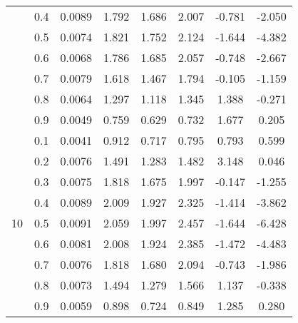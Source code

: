\documentclass[11pt,a4paper]{report}
\begin{document}
\begin{longtable}{ | c | c || c | c | c | c | c | c | }
 & 0.4 & 0.0089 & 1.792 & 1.686 & 2.007 & -0.781 & -2.050 \\
 & 0.5 & 0.0074 & 1.821 & 1.752 & 2.124 & -1.644 & -4.382 \\
 & 0.6 & 0.0068 & 1.786 & 1.685 & 2.057 & -0.748 & -2.667 \\
 & 0.7 & 0.0079 & 1.618 & 1.467 & 1.794 & -0.105 & -1.159 \\
 & 0.8 & 0.0064 & 1.297 & 1.118 & 1.345 & 1.388 & -0.271 \\
 & 0.9 & 0.0049 & 0.759 & 0.629 & 0.732 & 1.677 & 0.205 \\
 \hline
\multirow{9}{*}{10} & 0.1 & 0.0041 & 0.912 & 0.717 & 0.795 & 0.793 & 0.599 \\
 & 0.2 & 0.0076 & 1.491 & 1.283 & 1.482 & 3.148 & 0.046 \\
 & 0.3 & 0.0075 & 1.818 & 1.675 & 1.997 & -0.147 & -1.255 \\
 & 0.4 & 0.0089 & 2.009 & 1.927 & 2.325 & -1.414 & -3.862 \\
 & 0.5 & 0.0091 & 2.059 & 1.997 & 2.457 & -1.644 & -6.428 \\
 & 0.6 & 0.0081 & 2.008 & 1.924 & 2.385 & -1.472 & -4.483 \\
 & 0.7 & 0.0076 & 1.818 & 1.680 & 2.094 & -0.743 & -1.986 \\
 & 0.8 & 0.0073 & 1.494 & 1.279 & 1.566 & 1.137 & -0.338 \\
 & 0.9 & 0.0059 & 0.898 & 0.724 & 0.849 & 1.285 & 0.280 \\
 \hline
\hline
\end{longtable}
\end{document}
